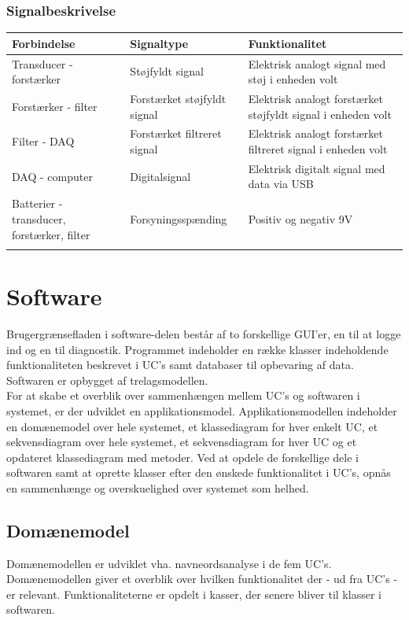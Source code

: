 \subsubsection{Signalbeskrivelse}

\begin{longtabu} to 
    \textbf{Forbindelse} &    \textbf{Signaltype} &    \textbf{Funktionalitet}\\[-1ex]
    \midrule
    Transducer - forstærker &    Støjfyldt signal &    Elektrisk analogt signal med støj i enheden volt\\
    Forstærker - filter &    Forstærket støjfyldt signal &    Elektrisk analogt forstærket støjfyldt signal i enheden volt\\
    Filter - DAQ &    Forstærket filtreret signal &    Elektrisk analogt forstærket filtreret signal i enheden volt\\
    DAQ - computer &   Digitalsignal &    Elektrisk digitalt signal med data via USB\\
    Batterier - transducer, forstærker, filter	&		Forsyningsspænding	&	Positiv og negativ 9V\\
\label{version_Signaltabel}
\end{longtabu}

\newpage

\section{Software}
Brugergrænsefladen i software-delen består af to forskellige GUI'er, en til at logge ind og en til diagnostik. Programmet indeholder en række klasser indeholdende funktionaliteten beskrevet i UC's samt databaser til opbevaring af data. Softwaren er opbygget af trelagsmodellen. \\
\newline
For at skabe et overblik over sammenhængen mellem UC's og softwaren i systemet, er der udviklet en applikationsmodel. Applikationsmodellen indeholder en domænemodel over hele systemet, et klassediagram for hver enkelt UC, et sekvensdiagram over hele systemet, et sekvensdiagram for hver UC og et opdateret klassediagram med metoder. Ved at opdele de forskellige dele i softwaren samt at oprette klasser efter den ønskede funktionalitet i UC's, opnås en sammenhænge og overskuelighed over systemet som helhed.


\subsection{Domænemodel}
Domænemodellen er udviklet vha. navneordsanalyse i de fem UC's. Domænemodellen giver et overblik over hvilken funktionalitet der - ud fra UC's - er relevant. Funktionaliteterne er opdelt i kasser, der senere bliver til klasser i softwaren. 

